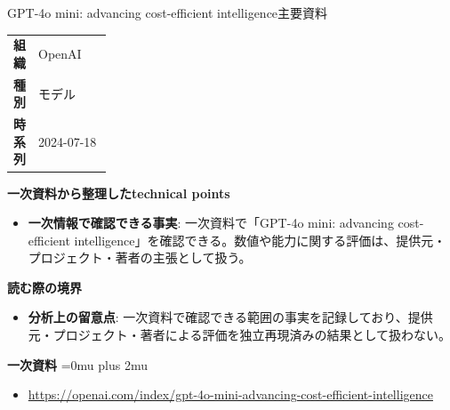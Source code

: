 \begin{technicalnote}{GPT-4o mini: advancing cost-efficient intelligence}{主要資料}
\begingroup
\begin{tabularx}{\linewidth}{@{}>{\bfseries}p{0.22\linewidth}X@{}}
組織 & OpenAI \\
種別 & モデル \\
時系列 & 2024-07-18 \\
\end{tabularx}
\smallskip
{\bfseries 一次資料から整理したtechnical points}
\begin{itemize}[leftmargin=1.5em,itemsep=0.35em]
\item \textbf{一次情報で確認できる事実}: 一次資料で「GPT-4o mini: advancing cost-efficient intelligence」を確認できる。数値や能力に関する評価は、提供元・プロジェクト・著者の主張として扱う。
\end{itemize}
\begin{minipage}{\linewidth}
{\bfseries 読む際の境界}
\begin{itemize}[leftmargin=1.5em,itemsep=0.35em]
\item \textbf{分析上の留意点}: 一次資料で確認できる範囲の事実を記録しており、提供元・プロジェクト・著者による評価を独立再現済みの結果として扱わない。
\end{itemize}
\begin{samepage}
{\bfseries 一次資料}
\begingroup\sloppy
\Urlmuskip=0mu plus 2mu\relax
\begin{itemize}[leftmargin=1.5em,itemsep=0.25em]
\item {\scriptsize\url{https://openai.com/index/gpt-4o-mini-advancing-cost-efficient-intelligence}}
\end{itemize}
\endgroup
\end{samepage}
\end{minipage}
\endgroup
\end{technicalnote}
\medskip

